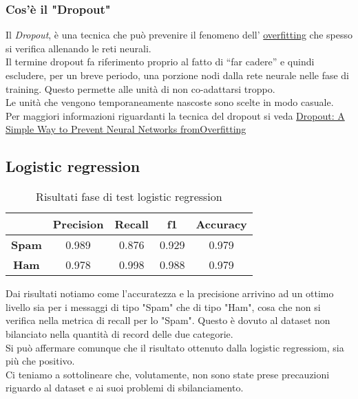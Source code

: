 \subsubsection{Cos'è il "Dropout"}
Il \textit{Dropout}, è una tecnica che può prevenire il fenomeno dell' \href{https://en.wikipedia.org/wiki/Overfitting}{overfitting} che spesso si verifica allenando le reti neurali.\\
Il termine dropout fa riferimento proprio al fatto di ``far cadere'' e quindi escludere, per un breve periodo, una porzione nodi dalla rete neurale nelle fase di training. Questo permette alle unità di non co-adattarsi troppo.\\
Le unità che vengono temporaneamente nascoste sono scelte in modo casuale.\\
Per maggiori informazioni riguardanti la tecnica del dropout si 
veda \href{http://www.jmlr.org/papers/volume15/srivastava14a/srivastava14a.pdf}{Dropout: A Simple Way to Prevent Neural Networks fromOverfitting}
\subsection{Logistic regression}
\renewcommand{\arraystretch}{1.4}
\begin{table}[H]
	\begin{center}
		\begin{tabular}{|c|c|c|c|c|}
			\hline
			&\textbf{Precision} & \textbf{Recall} & \textbf{f1} & \textbf{Accuracy}\\ \hline
			\textbf{Spam} & 0.989  & 0.876 & 0.929 & 0.979 \\ \hline
			\textbf{Ham} & 0.978  & 0.998 & 0.988 & 0.979\\ \hline
		\end{tabular}
		\caption{Risultati fase di test logistic regression\label{}}
	\end{center}
\end{table}
\renewcommand{\arraystretch}{1}
Dai risultati notiamo come l'accuratezza e la precisione arrivino ad un ottimo livello sia per i messaggi di tipo "Spam" che di tipo "Ham", cosa che non si verifica nella metrica di recall per lo "Spam". Questo è dovuto al dataset non bilanciato nella quantità di record delle due categorie. \\
Si può affermare comunque che il risultato ottenuto dalla logistic regressiom, sia più che positivo.\\
Ci teniamo a sottolineare che, volutamente, non sono state prese precauzioni riguardo al dataset e ai suoi problemi di sbilanciamento.